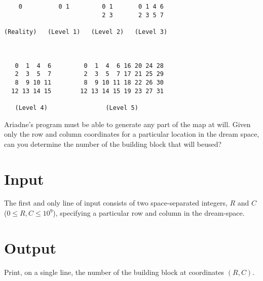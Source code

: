 \begin{center}\ttfamily{}
\begin{minipage}{45\wd0}
\begin{verbatim}
    0          0 1         0 1       0 1 4 6
                           2 3       2 3 5 7

(Reality)   (Level 1)   (Level 2)   (Level 3)



   0  1  4  6         0  1  4  6 16 20 24 28
   2  3  5  7         2  3  5  7 17 21 25 29
   8  9 10 11         8  9 10 11 18 22 26 30
  12 13 14 15        12 13 14 15 19 23 27 31

   (Level 4)                (Level 5)

\end{verbatim}
\end{minipage}
\end{center}

Ariadne's program must be able to generate any part of the map at will. Given only the row and column coordinates for a particular location in the dream space, can you determine the number of the building block that will beused?

\section*{Input}
The first and only line of input consists of two space-separated integers, $R$ and $C$ ($0 \leq R, C \leq 10^{9}$), specifying a particular row and column in the dream-space.

\section*{Output}
Print, on a single line, the number of the building block at coordinates $(R, C)$.